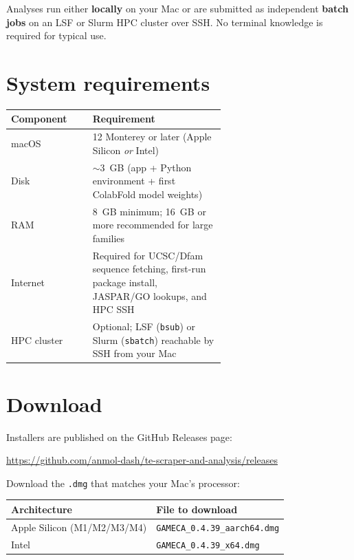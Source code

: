 \documentclass[11pt]{article}
\begin{document}
Analyses run either \textbf{locally} on your Mac or are submitted as
independent \textbf{batch jobs} on an LSF or Slurm HPC cluster over SSH.
No terminal knowledge is required for typical use.

\section{System requirements}

\begin{tabular}{@{}lp{0.62\linewidth}@{}}
\toprule
Component & Requirement \\
\midrule
macOS & 12 Monterey or later (Apple Silicon \emph{or} Intel) \\
Disk  & $\sim$3~GB (app + Python environment + first ColabFold model weights) \\
RAM   & 8~GB minimum; 16~GB or more recommended for large families \\
Internet & Required for UCSC/Dfam sequence fetching, first-run package
           install, JASPAR/GO lookups, and HPC SSH \\
HPC cluster & Optional; LSF (\texttt{bsub}) or Slurm (\texttt{sbatch})
              reachable by SSH from your Mac \\
\bottomrule
\end{tabular}

\section{Download}

Installers are published on the GitHub Releases page:

\begin{center}
  \url{https://github.com/anmol-dash/te-scraper-and-analysis/releases}
\end{center}

Download the \texttt{.dmg} that matches your Mac's processor:

\begin{tabular}{@{}ll@{}}
\toprule
Architecture & File to download \\
\midrule
Apple Silicon (M1/M2/M3/M4) & \texttt{GAMECA\_0.4.39\_aarch64.dmg} \\
Intel & \texttt{GAMECA\_0.4.39\_x64.dmg} \\
\bottomrule
\end{tabular}
\end{document}

